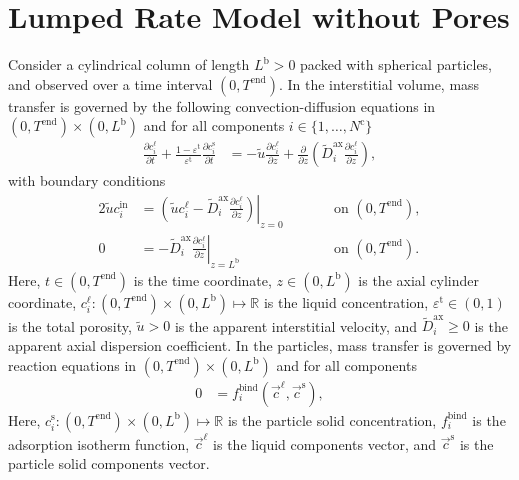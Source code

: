 \documentclass{article}
\begin{document}
\section*{Lumped Rate Model without Pores}
Consider a cylindrical column of length $L^{\mathrm{b}} > 0$ packed with spherical particles, and observed over a time interval $(0, T^{\mathrm{end}})$.
In the interstitial volume, mass transfer is governed by the following convection-diffusion equations in $(0, T^{\mathrm{end}})\times (0, L^{\mathrm{b}})$ and for all components $i\in\{1, \dots, N^{\mathrm{c}} \}$
\begin{align}
    \frac{\partial c^{\mathrm{\ell}}_{i}}{\partial t}
        + \frac{1 - \varepsilon^{\mathrm{t}}}{\varepsilon^{\mathrm{t}}} \frac{\partial c^{\mathrm{s}}_{i}}{\partial t}
    &= - \tilde{u} \frac{\partial c^{\mathrm{\ell}}_{i} }{\partial z}
        + \frac{\partial}{\partial z} \left( \tilde{D}^{\mathrm{ax}}_{i} \frac{\partial c^{\mathrm{\ell}}_{i}}{\partial z} \right),
\end{align}
with boundary conditions
\begin{alignat}{2}
    \tilde{u} c^{\mathrm{in}}_{i}
    &= \left.\left( \tilde{u} c^{\mathrm{\ell}}_{i} - \tilde{D}^{\mathrm{ax}}_{i} \frac{\partial c^{\mathrm{\ell}}_{i}}{\partial z}\right)\right|_{z=0}
    & & \qquad\text{on }(0, T^{\mathrm{end}}),
    \\
    0
    &= - \tilde{D}^{\mathrm{ax}}_{i} \left. \frac{\partial c^{\mathrm{\ell}}_{i}}{\partial z} \right|_{z=L^{\mathrm{b}}}
    & & \qquad\text{on }(0, T^{\mathrm{end}}).
\end{alignat}
Here, $t\in (0, T^{\mathrm{end}})$ is the time coordinate, $z\in (0, L^{\mathrm{b}})$ is the axial cylinder coordinate, $c^{\mathrm{\ell}}_{i}\colon (0, T^{\mathrm{end}})\times (0, L^{\mathrm{b}}) \mapsto \mathbb{R}$ is the liquid concentration, $\varepsilon^{\mathrm{t}}\in (0, 1)$ is the total porosity, $\tilde{u}> 0$ is the apparent interstitial velocity, and $\tilde{D}^{\mathrm{ax}}_{i}\geq 0$ is the apparent axial dispersion coefficient.
In the particles, mass transfer is governed by reaction equations in $(0, T^{\mathrm{end}}) \times (0, L^{\mathrm{b}})$ and for all components
\begin{align}
    0
    &= f^{\mathrm{bind}}_{i}\left( \vec{c}^{\mathrm{\ell}}, \vec{c}^{\mathrm{s}} \right),
\end{align}
Here, $c^{\mathrm{s}}_{i}\colon (0, T^{\mathrm{end}}) \times (0, L^{\mathrm{b}}) \mapsto \mathbb{R}$ is the particle solid concentration, $f^{\mathrm{bind}}_{i}$ is the adsorption isotherm function, $\vec{c}^{\mathrm{\ell}}$ is the liquid components vector, and $\vec{c}^{\mathrm{s}}$ is the particle solid components vector.
\end{document}
